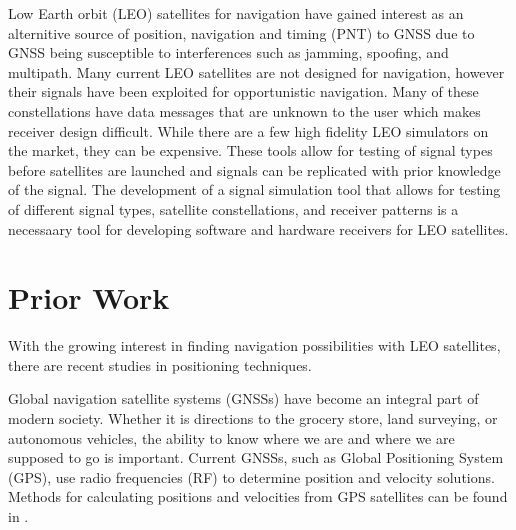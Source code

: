 \documentclass[12pt]{report}
\begin{document}
Low Earth orbit (LEO) satellites for navigation have gained interest as an alternitive source of position, navigation and timing (PNT) to GNSS due to GNSS being susceptible to interferences such as jamming, spoofing, and multipath. Many current LEO satellites are not designed for navigation, however their signals have been exploited for opportunistic navigation. Many of these constellations have data messages that are unknown to the user which makes receiver design difficult. While there are a few high fidelity LEO simulators on the market, they can be expensive. These tools allow for testing of signal types before satellites are launched and signals can be replicated with prior knowledge of the signal. The development of a signal simulation tool that allows for testing of different signal types, satellite constellations, and receiver patterns is a necessaary tool for developing software and hardware receivers for LEO satellites.  

\section { Prior Work }
With the growing interest in finding navigation possibilities with LEO satellites, there are recent studies in positioning techniques. 

Global navigation satellite systems (GNSSs) have become an integral part of modern society. Whether it is directions to the grocery store, land surveying, or autonomous vehicles, the ability to know where we are and where we are supposed to go is important. Current GNSSs, such as Global Positioning System (GPS), use radio frequencies (RF) to determine position and velocity solutions. Methods for calculating positions and velocities from GPS satellites can be found in \cite{misraGlobalPositioningSystem2012}.
\end{document}
